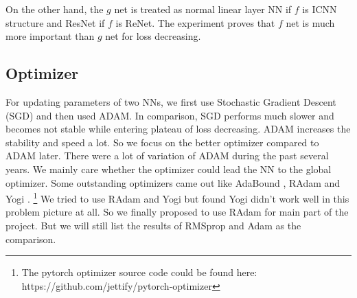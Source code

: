 \documentclass[conference,compsoc]{IEEEtran}
\begin{document}
On the other hand, the $g$ net is treated as normal linear layer NN if $f$ is ICNN structure and ResNet if $f$ is ReNet. The experiment proves that $f$ net is much more important than $g$ net for loss decreasing.

\subsection{Optimizer}
For updating parameters of two NNs, we first use Stochastic Gradient Descent (SGD) and then used ADAM. In comparison, SGD performs much slower and becomes not stable while entering plateau of loss decreasing. ADAM increases the stability and speed a lot. So we focus on the better optimizer compared to ADAM later. There were a lot of variation of ADAM during the past several years. We mainly care whether the optimizer could lead the NN to the global optimizer. Some outstanding optimizers came out like AdaBound \cite{luo2019adaptive}, RAdam \cite{liu2019variance} and Yogi \cite{zaheer2018adaptive}. \footnote{The pytorch optimizer source code could be found here: https://github.com/jettify/pytorch-optimizer}
We tried to use RAdam and Yogi but found Yogi didn't work well in this problem picture at all. So we finally proposed to use RAdam for main part of the project. But we will still list the results of RMSprop and Adam as the comparison.
\end{document}
